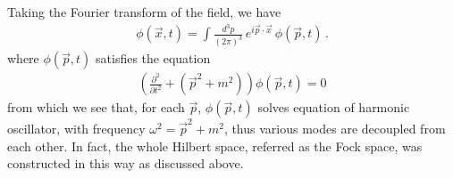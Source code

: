 \documentclass[11pt, onesided]{book}
\theoremstyle{break}
\theoremstyle{break}
\newcommand{\pd}{\partial}
\begin{document}
Taking the Fourier transform of the field, we have
\begin{align*}
\phi(\vec{x},t) = \int \frac{d^3 p }{(2\pi)^3}\, e^{i\vec{p}\cdot \vec{x}} \, \phi(\vec{p},t)\,.
\end{align*}
where $\phi(\vec{p},t)$ satisfies the equation
\begin{align*}
\left( \frac{\pd^2}{\pd t^2} + (\vec{p}^2 + m^2) \right) \phi(\vec{p},t) = 0
\end{align*}
from which we see that, for each $\vec{p}$, $\phi(\vec{p},t)$ solves equation of harmonic oscillator, with frequency $\omega^2 = \vec{p}^2 + m^2$, thus various modes are decoupled from each other. In fact, the whole Hilbert space, referred as the Fock space, was constructed in this way as discussed above. \\

\end{document}
